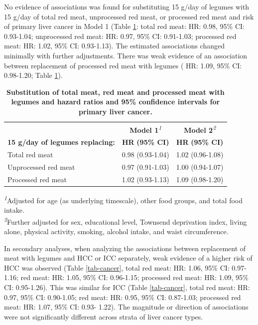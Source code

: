 \documentclass[nutrients,article,submit,moreauthors,pdftex]{Definitions/mdpi}
\begin{document}
No evidence of associations was found for substituting 15 g/day of
legumes with 15 g/day of total red meat, unprocessed red meat, or
processed red meat and risk of primary liver cancer in Model 1 (Table
\ref{tab-main}: total red meat: HR: 0.98, 95\% CI: 0.93-1.04;
unprocessed red meat: HR: 0.97, 95\% CI: 0.91-1.03; processed red meat:
HR: 1.02, 95\% CI: 0.93-1.13). The estimated associations changed
minimally with further adjustments. There was weak evidence of an
association between replacement of processed red meat with legumes ( HR:
1.09, 95\% CI: 0.98-1.20; Table \ref{tab-main}).

\begin{table}[!t]
\caption{{\small \textbf{Substitution of total meat, red meat and processed meat with legumes and hazard ratios and 95\% confidence intervals for primary liver cancer.}}}\label{tab-main}
\begin{tabular*}{1\linewidth}{@{\extracolsep{\fill}}lcc}
\toprule
 & {\bfseries \textbf{Model 1}}\textsuperscript{\textit{1}} & {\bfseries \textbf{Model 2}}\textsuperscript{\textit{2}} \\ 
\cmidrule(lr){2-2} \cmidrule(lr){3-3}
\textbf{15 g/day of legumes replacing:} & \textbf{HR} \textbf{(95\% CI)} & \textbf{HR} \textbf{(95\% CI)} \\ 
\midrule\addlinespace[2.5pt]
Total red meat & 0.98 (0.93-1.04) & 1.02 (0.96-1.08) \\ 
Unprocessed red meat & 0.97 (0.91-1.03) & 1.00 (0.94-1.07) \\ 
Processed red meat & 1.02 (0.93-1.13) & 1.09 (0.98-1.20) \\ 
\bottomrule
\end{tabular*}
\begin{minipage}{\linewidth}
\textsuperscript{\textit{1}}Adjusted for age (as underlying timescale), other food groups, and total food intake.\\
\textsuperscript{\textit{2}}Further adjusted for sex, educational level, Townsend deprivation index, living alone, physical activity, smoking, alcohol intake, and waist circumference.\\
\end{minipage}
\end{table}

In secondary analyses, when analyzing the associations between
replacement of meat with legumes and HCC or ICC separately, weak
evidence of a higher risk of HCC was observed (Table \ref{tab-cancer},
total red meat: HR: 1.06, 95\% CI: 0.97-1.16; red meat: HR: 1.05, 95\%
CI: 0.96-1.15; processed red meat: HR: 1.09, 95\% CI: 0.95-1.26). This
was similar for ICC (Table \ref{tab-cancer}, total red meat: HR: 0.97,
95\% CI: 0.90-1.05; red meat: HR: 0.95, 95\% CI: 0.87-1.03; processed
red meat: HR: 1.07, 95\% CI: 0.93- 1.22). The magnitude or direction of
associations were not significantly different across strata of liver
cancer types.
\end{document}
